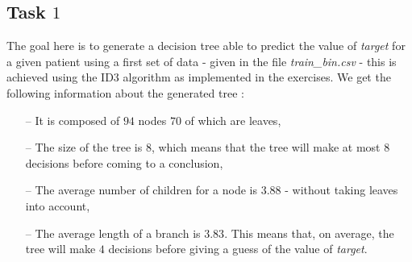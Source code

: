 \documentclass[9pt]{extarticle}
\DeclarePairedDelimiter\ceil{\lceil}{\rceil}
\begin{document}
\subsection{Task $1$}
	The goal here is to generate a decision tree able to predict the value of \emph{target} for a given patient using a first set of data - given in the file \emph{train\_bin.csv} - this is achieved using the ID3 algorithm as implemented in the exercises. We get the following information about the generated tree :
	\begin{itemize}[topsep=0pt,itemsep=0pt,partopsep=0pt, parsep=0pt]
		\item[--] It is composed of $94$ nodes $70$ of which are leaves,
		\item[--] The size of the tree is 8, which means that the tree will make at most $8$ decisions before coming to a conclusion,
		\item[--] The average number of children for a node is $3.88$ - without taking leaves into account,
		\item[--] The average length of a branch is $3.83$.  This means that, on average, the tree will make $4$ decisions before giving a guess of the value of \emph{target}.
	\end{itemize}
\end{document}
